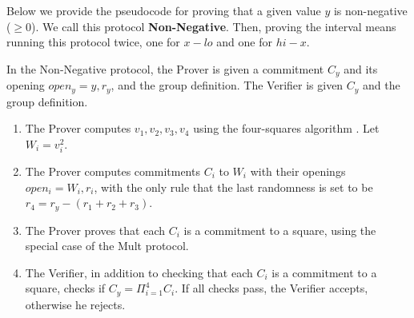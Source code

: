 Below we provide the pseudocode for proving that a given value $y$ is non-negative ($\geq 0$). We call this protocol \textbf{Non-Negative}. Then, proving the interval means running this protocol twice, one for $x-lo$ and one for $hi-x$.

In the Non-Negative protocol, the Prover is given a commitment $C_y$ and its opening $open_y = y,r_y$, and the group definition. The Verifier is given $C_y$ and the group definition.

\begin{enumerate}
 \item The Prover computes $v_1,v_2,v_3,v_4$ using the four-squares algorithm \cite{lipmaaInterval,rabinShallit}. Let $W_i = v_{i}^{2}$.
 \item The Prover computes commitments $C_i$ to $W_i$ with their openings $open_i = W_i,r_i$, with the only rule that the last randomness is set to be $r_4 = r_y - (r_1+r_2+r_3)$.
 \item The Prover proves that each $C_i$ is a commitment to a square, using the special case of the Mult protocol.
 \item The Verifier, in addition to checking that each $C_i$ is a commitment to a square, checks if $C_y = \Pi_{i=1}^{4} C_i$. If all checks pass, the Verifier accepts, otherwise he rejects.
\end{enumerate}

